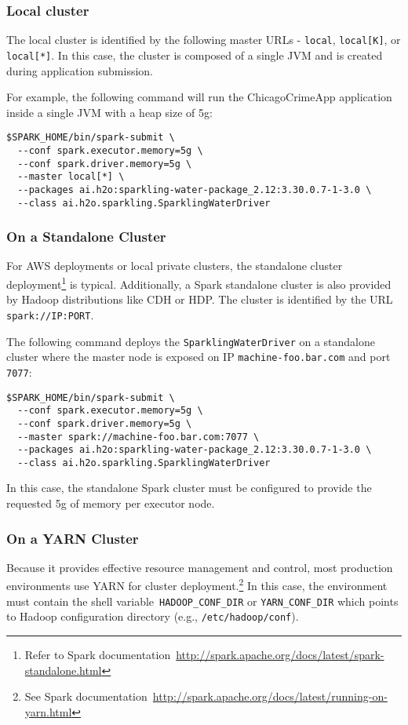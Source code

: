 \subsubsection{Local cluster}
The local cluster is identified by the following master URLs - \texttt{local}, \texttt{local[K]}, or \texttt{local[*]}. In this
case, the cluster is composed of a single JVM and is created during application submission.

For example, the following command will run the ChicagoCrimeApp application inside a single JVM with a heap size of 5g:
\begin{lstlisting}[style=Bash]
$SPARK_HOME/bin/spark-submit \ 
  --conf spark.executor.memory=5g \
  --conf spark.driver.memory=5g \
  --master local[*] \
  --packages ai.h2o:sparkling-water-package_2.12:3.30.0.7-1-3.0 \
  --class ai.h2o.sparkling.SparklingWaterDriver
\end{lstlisting}

\subsubsection{On a Standalone Cluster}
For AWS deployments or local private clusters, the standalone cluster
deployment\footnote{Refer to Spark documentation~\url{http://spark.apache.org/docs/latest/spark-standalone.html}} is
typical. Additionally, a Spark standalone cluster is also provided by Hadoop distributions like CDH or HDP. The cluster is
identified by the URL \texttt{spark://IP:PORT}.

The following command deploys the \texttt{SparklingWaterDriver} on a standalone cluster where the master node
is exposed on IP \texttt{machine-foo.bar.com} and port \texttt{7077}:

\begin{lstlisting}[style=Bash]
$SPARK_HOME/bin/spark-submit \ 
  --conf spark.executor.memory=5g \
  --conf spark.driver.memory=5g \
  --master spark://machine-foo.bar.com:7077 \
  --packages ai.h2o:sparkling-water-package_2.12:3.30.0.7-1-3.0 \
  --class ai.h2o.sparkling.SparklingWaterDriver
\end{lstlisting}

In this case, the standalone Spark cluster must be configured to provide the requested 5g of memory per executor node.

\subsubsection{On a YARN Cluster}
Because it provides effective resource management and control, most production environments use YARN for cluster
deployment.\footnote{See Spark documentation~\url{http://spark.apache.org/docs/latest/running-on-yarn.html}}
In this case, the environment must contain the shell variable~\texttt{HADOOP\_CONF\_DIR} or \texttt{YARN\_CONF\_DIR} which
points to Hadoop configuration directory (e.g., \texttt{/etc/hadoop/conf}).

